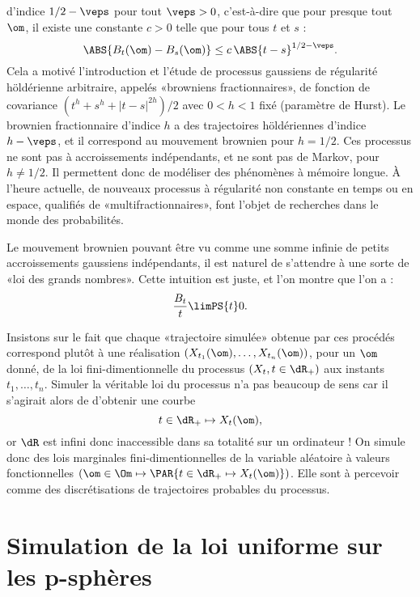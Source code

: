 d'indice $1/2-\veps$ pour tout $\veps>0$, c'est-à-dire que pour presque tout
$\om$, il existe une constante $c>0$ telle que pour tous $t$ et $s$ :
$$
\ABS{B_t(\om)-B_s(\om)} \leq c\,\ABS{t-s}^{1/2-\veps}.
$$
Cela a motivé l'introduction et l'étude de processus gaussiens de
régularité höldérienne arbitraire, appelés «browniens fractionnaires», de
fonction de covariance $(t^h+s^h+|t-s|^{2h})/2$ avec $0<h<1$ fixé (paramètre
de Hurst). Le brownien fractionnaire d'indice $h$ a des trajectoires
höldériennes d'indice $h-\veps$, et il correspond au mouvement brownien pour
$h=1/2$. Ces processus ne sont pas à accroissements indépendants, et ne sont
pas de Markov, pour $h\neq 1/2$. Il permettent donc de modéliser des
phénomènes à mémoire longue. À l'heure actuelle, de nouveaux processus à
régularité non constante en temps ou en espace, qualifiés de
«multifractionnaires», font l'objet de recherches dans le monde des
probabilités.

\begin{remark}
  Le mouvement brownien pouvant être vu comme une somme infinie de petits
  accroissements gaussiens indépendants, il est naturel de s'attendre à une
  sorte de «loi des grands nombres». Cette intuition est juste, et l'on montre
  que l'on a :
  \begin{equation}
    \frac{B_t}{t} \limPS{t} 0.\label{eq:LGN-brown}
  \end{equation}
\end{remark}

\begin{remark}
  Insistons sur le fait que chaque «trajectoire simulée» obtenue par ces
  procédés correspond plutôt à une réalisation
  $(X_{t_1}(\om),\ldots,X_{t_n}(\om))$, pour un $\om$ donné, de la loi
  fini-dimentionnelle du processus $(X_t,t\in\dR_+)$ aux instants
  $t_1,\ldots,t_n$.  Simuler la véritable loi du processus n'a pas beaucoup de
  sens car il s'agirait alors de d'obtenir une courbe 
  $$t\in\dR_+\mapsto X_t(\om),$$
  or $\dR$ est infini donc inaccessible dans sa
  totalité sur un ordinateur !  On simule donc des lois marginales
  fini-dimentionnelles de la variable aléatoire à valeurs fonctionnelles
  $(\om\in\Om\mapsto\PAR{t\in\dR_+\mapsto X_t(\om)})$. Elle sont à percevoir
  comme des discrétisations de trajectoires probables du processus.
\end{remark}

%
\section{Simulation de la loi uniforme sur les p-sphères}
\label{se:unif-pspheres}
%

